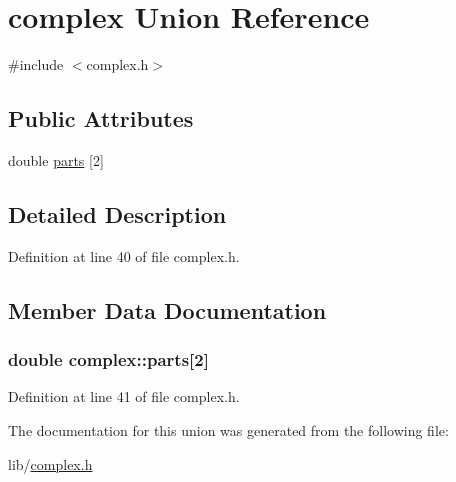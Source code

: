 \hypertarget{unioncomplex}{}\section{complex Union Reference}
\label{unioncomplex}


{\ttfamily \#include $<$complex.\+h$>$}

\subsection*{Public Attributes}
\begin{DoxyCompactItemize}
\item 
double \hyperlink{unioncomplex_a71525ae4cc371e8419025b0c4887199a}{parts} \mbox{[}2\mbox{]}
\end{DoxyCompactItemize}


\subsection{Detailed Description}


Definition at line 40 of file complex.\+h.



\subsection{Member Data Documentation}
\subsubsection[{\texorpdfstring{parts}{parts}}]{\setlength{\rightskip}{0pt plus 5cm}double complex\+::parts\mbox{[}2\mbox{]}}\hypertarget{unioncomplex_a71525ae4cc371e8419025b0c4887199a}{}\label{unioncomplex_a71525ae4cc371e8419025b0c4887199a}


Definition at line 41 of file complex.\+h.



The documentation for this union was generated from the following file\+:\begin{DoxyCompactItemize}
\item 
lib/\hyperlink{complex_8h}{complex.\+h}\end{DoxyCompactItemize}
